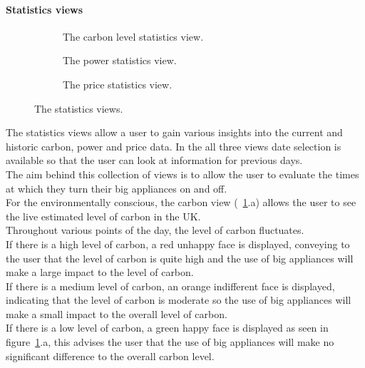\documentclass[preprint,12pt,3p]{elsarticle}
\begin{document}
\paragraph{Statistics views}
\begin{figure}[H]
    \centering
    \begin{subfigure}[t]{0.32\columnwidth}
        \centering
        \caption{The carbon level statistics view.}
    \end{subfigure}
    \begin{subfigure}[t]{0.32\columnwidth}
        \centering
        \caption{The power statistics view.}
    \end{subfigure}
    \begin{subfigure}[t]{0.32\columnwidth}
        \centering
        \caption{The price statistics view.}
    \end{subfigure}
    \caption {The statistics views.}
    \label{fig:statisticsviews}
\end{figure}
The statistics views allow a user to gain various insights into the current and historic carbon, power and price data. In the all three views date selection is available so that the user can look at information for previous days.\\
The aim behind this collection of views is to allow the user to evaluate the times at which they turn their big appliances on and off.\\
For the environmentally conscious, the carbon view (~\ref{fig:statisticsviews}.a) allows the user to see the live estimated level of carbon in the UK.\\ 
Throughout various points of the day, the level of carbon fluctuates.\\ 
If there is a high level of carbon, a red unhappy face is displayed, conveying to the user that the level of carbon is quite high and the use of big appliances will make a large impact to the level of carbon. \\
If there is a medium level of carbon, an orange indifferent face is displayed, indicating that the level of carbon is moderate so the use of big appliances will make a small impact to the overall level of carbon.\\
If there is a low level of carbon, a green happy face is displayed as seen in figure~\ref{fig:statisticsviews}.a, this advises the user that the use of big appliances will make no significant difference to the overall carbon level.\\
\end{document}
